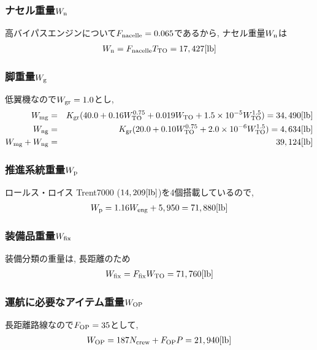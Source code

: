 \documentclass[12pt]{jsarticle}
\begin{document}
\subsubsection{ナセル重量$W_{\rm n}$}
高バイパスエンジンについて$F_{\rm nacelle} = 0.065$であるから, ナセル重量$W_{\rm n}$は
\begin{eqnarray*}
W_{\rm n} = F_{\rm nacelle}T_{\rm TO} = 17,427 [\rm lb]
\end{eqnarray*}

\subsubsection{脚重量$W_{\rm g}$}
低翼機なので$W_{\rm gr}=1.0$とし,
\begin{eqnarray*}
W_{\rm mg} &=& K_{\rm gr} (40.0 + 0.16W_{\rm TO}^{0.75} + 0.019W_{\rm TO} + 1.5 \times 10^{-5}W_{\rm TO}^{1.5}) = 34,490 [\rm lb] \\
W_{\rm ng} &=& K_{\rm gr} (20.0 + 0.10W_{\rm TO}^{0.75} + 2.0 \times 10^{-6}W_{\rm TO}^{1.5}) = 4,634 [\rm lb] \\
W_{\rm mg} + W_{\rm ng} &=& 39,124 [\rm lb]
\end{eqnarray*}

\subsubsection{推進系統重量$W_{\rm p}$}
ロールス・ロイス Trent7000 ($14,209[\rm lb]$)を4個搭載しているので,
\begin{eqnarray*}
W_{\rm p} = 1.16W_{\rm eng} + 5,950 = 71,880 [\rm lb]
\end{eqnarray*}

\subsubsection{装備品重量$W_{\rm fix}$}
装備分類の重量は, 長距離のため
\begin{eqnarray*}
W_{\rm fix} = F_{\rm fix}W_{\rm TO} = 71,760 [\rm lb]
\end{eqnarray*}

\subsubsection{運航に必要なアイテム重量$W_{\rm OP}$}
長距離路線なので$F_{\rm OP}=35$として,
\begin{eqnarray*}
W_{\rm OP} = 187N_{\rm crew} + F_{\rm OP}P = 21,940 [\rm lb]
\end{eqnarray*}
\end{document}
